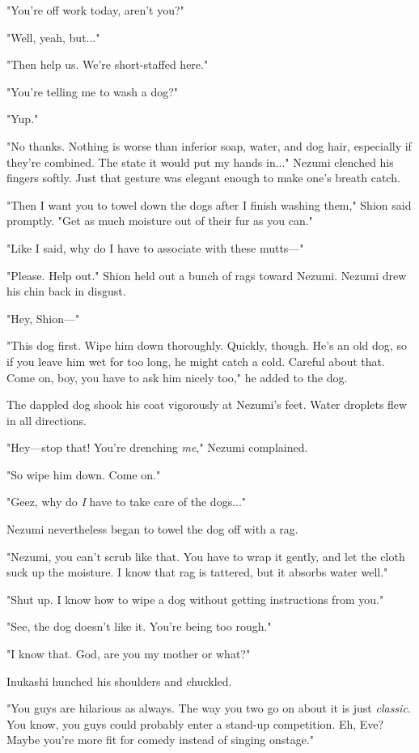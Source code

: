 "You're off work today, aren't you?"

"Well, yeah, but..."

"Then help us. We're short-staffed here."

"You're telling me to wash a dog?"

"Yup."

"No thanks. Nothing is worse than inferior soap, water, and dog hair,
especially if they're combined. The state it would put my hands in..."
Nezumi clenched his fingers softly. Just that gesture was elegant enough
to make one's breath catch.

"Then I want you to towel down the dogs after I finish washing them,"
Shion said promptly. "Get as much moisture out of their fur as you can."

"Like I said, why do I have to associate with these mutts---"

"Please. Help out." Shion held out a bunch of rags toward Nezumi. Nezumi
drew his chin back in disgust.

"Hey, Shion---"

"This dog first. Wipe him down thoroughly. Quickly, though. He's an old
dog, so if you leave him wet for too long, he might catch a cold.
Careful about that. Come on, boy, you have to ask him nicely too," he
added to the dog.

The dappled dog shook his coat vigorously at Nezumi's feet. Water
droplets flew in all directions.

"Hey---stop that! You're drenching \emph{me}," Nezumi complained.

"So wipe him down. Come on."

"Geez, why do \emph{I} have to take care of the dogs..."

Nezumi nevertheless began to towel the dog off with a rag.

"Nezumi, you can't scrub like that. You have to wrap it gently, and let
the cloth suck up the moisture. I know that rag is tattered, but it
absorbs water well."

"Shut up. I know how to wipe a dog without getting instructions from
you."

"See, the dog doesn't like it. You're being too rough."

"I know that. God, are you my mother or what?"

Inukashi hunched his shoulders and chuckled.

"You guys are hilarious as always. The way you two go on about it is
just \emph{classic}. You know, you guys could probably enter a stand-up
competition. Eh, Eve? Maybe you're more fit for comedy instead of
singing onstage."


